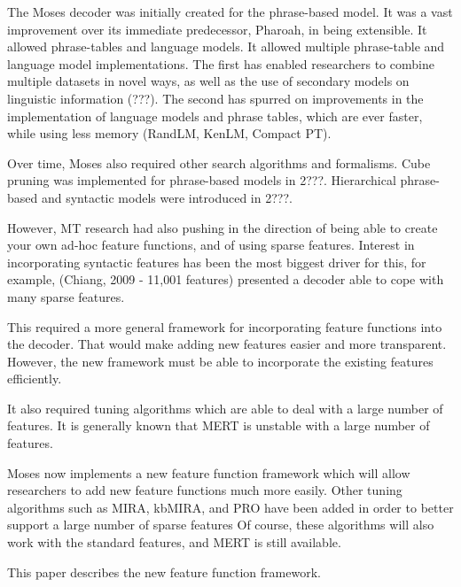 \documentclass{pbml}
\begin{document}

The Moses decoder was initially created for the phrase-based model. It was a vast improvement over its immediate predecessor, Pharoah, in being extensible. It allowed phrase-tables and language models. It allowed multiple phrase-table and language model implementations. The first has enabled researchers to combine multiple datasets in novel ways, as well as the use of secondary models on linguistic information (???). The second has spurred on improvements in the implementation of language models and phrase tables, which are ever faster, while using less memory (RandLM, KenLM, Compact PT).

Over time, Moses also required other search algorithms and formalisms. Cube pruning was implemented for phrase-based models in 2???. Hierarchical phrase-based and syntactic models were introduced in 2???.

However, MT research had also pushing in the direction of being able to create your own ad-hoc feature functions, and of using sparse features. Interest in incorporating syntactic features has been the most biggest driver for this, for example, (Chiang, 2009 - 11,001 features) presented a decoder able to cope with many sparse features.

This required a more general framework for incorporating feature functions into the decoder. That would make adding new features easier and more transparent. However, the new framework must be able to incorporate the existing features efficiently.

It also required tuning algorithms which are able to deal with a large number of features. It is generally known that MERT is unstable with a large number of features.

Moses now implements a new feature function framework which will allow researchers to add new feature functions much more easily. Other tuning algorithms such as MIRA, kbMIRA, and PRO have been added in order to better support a large number of sparse features  Of course, these algorithms will also work with the standard features, and MERT is still available.

This paper describes the new feature function framework.
\end{document}
